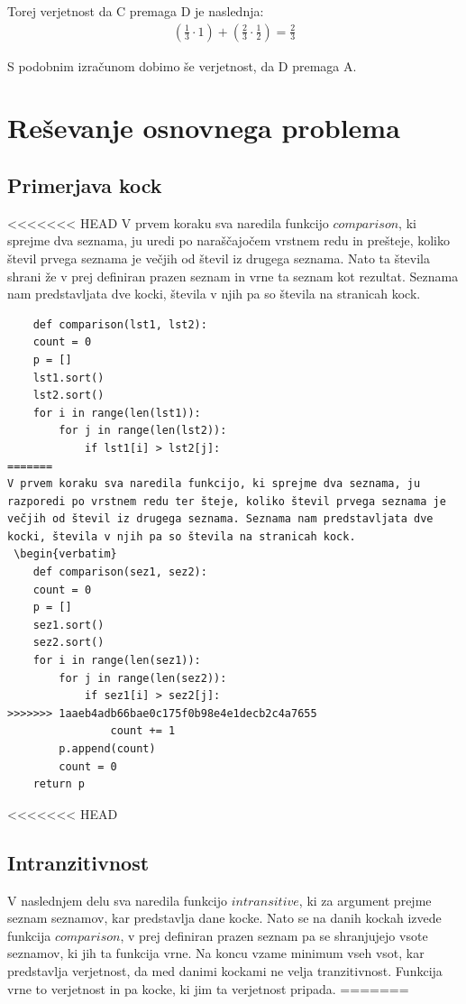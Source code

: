 \documentclass[12pt,a4paper]{amsart}
\begin{document}
Torej verjetnost da C premaga D je naslednja:
\begin{align*}
    (\frac{1}{3}\cdot 1)+(\frac{2}{3}\cdot\frac{1}{2}) = \frac{2}{3}
\end{align*}

S podobnim izračunom dobimo še verjetnost, da D premaga A.


\section{Reševanje osnovnega problema}
\subsection{Primerjava kock}
<<<<<<< HEAD
V prvem koraku sva naredila funkcijo $comparison$, ki \linebreak
sprejme dva seznama, ju uredi po naraščajočem vrstnem redu in prešteje, koliko števil prvega seznama je večjih od števil iz drugega seznama. Nato ta števila shrani že 
v prej definiran prazen seznam in vrne ta seznam kot rezultat.
Seznama nam predstavljata dve kocki, števila v njih pa so števila na stranicah kock.
 \begin{verbatim}
    def comparison(lst1, lst2):
    count = 0
    p = []
    lst1.sort()
    lst2.sort()
    for i in range(len(lst1)):
        for j in range(len(lst2)):
            if lst1[i] > lst2[j]: 
=======
V prvem koraku sva naredila funkcijo, ki sprejme dva seznama, ju razporedi po vrstnem redu ter šteje, koliko števil prvega seznama je večjih od števil iz drugega seznama. Seznama nam predstavljata dve kocki, števila v njih pa so števila na stranicah kock.
 \begin{verbatim}
    def comparison(sez1, sez2):
    count = 0
    p = []
    sez1.sort()
    sez2.sort()
    for i in range(len(sez1)):
        for j in range(len(sez2)):
            if sez1[i] > sez2[j]: 
>>>>>>> 1aaeb4adb66bae0c175f0b98e4e1decb2c4a7655
                count += 1
        p.append(count) 
        count = 0 
    return p
 \end{verbatim}

<<<<<<< HEAD
 \subsection{Intranzitivnost}
 V naslednjem delu sva naredila funkcijo $intransitive$, ki za argument prejme seznam seznamov, kar predstavlja dane kocke.
 Nato se na danih kockah izvede funkcija $comparison$, v prej definiran prazen seznam pa se shranjujejo vsote seznamov, ki jih ta funkcija vrne.
 Na koncu vzame minimum vseh vsot, kar predstavlja verjetnost, da med danimi kockami ne velja tranzitivnost. Funkcija vrne to verjetnost in pa kocke, ki jim ta verjetnost pripada.
=======
\end{document}
